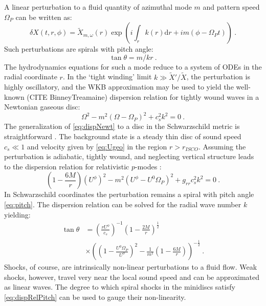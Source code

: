 \documentclass{emulateapj}
\newcommand{\dd}{\mbox{d}}
\begin{document}
A linear perturbation to a fluid quantity of azimuthal mode $m$ and pattern speed $\Omega_P$ can be written as:
\begin{equation}
	\delta X(t, r, \phi) = \tilde{X}_{m,\omega}(r) \exp \left( i \int_r k(r) \dd r  + i m (\phi - \Omega_P t) \right)\ . \label{eq:pert}
\end{equation}
Such perturbations are spirals with pitch angle:
\begin{equation}
	\tan \theta = m / k r \ . \label{eq:pitch}
\end{equation}
The hydrodynamics equations for such a mode reduce to a system of ODEs in the radial coordinate $r$.  In the `tight winding' limit $k \gg \tilde{X}'/\tilde{X}$, the perturbation is highly oscillatory, and the WKB approximation may be used to yield the well-known (CITE BinneyTreamaine) dispersion relation for tightly wound waves in a Newtonian gaseous disc:
\begin{equation}
	\Omega^2 - m^2(\Omega-\Omega_P)^2 + c_s^2 k^2 = 0 \ . \label{eq:dispNewt}
\end{equation}
The generalization of \eqref{eq:dispNewt} to a disc in the Schwarzschild metric is straightforward \citep{Perez97}.  The background state is a steady thin disc of sound speed $c_s \ll 1$ and velocity given by \eqref{eq:Ugeo} in the region $r > r_{ISCO}$.  Assuming the perturbation is adiabatic, tightly wound, and neglecting vertical structure leads to the dispersion relation for relativistic $p$-modes \citep{Abramowicz13}:
\begin{equation}
	\left(1-\frac{6M}{r} \right)\left(U^\phi\right)^2 - m^2(U^\phi-U^0\Omega_P)^2 + g_{rr} c_s^2 k^2 = 0 \ . \label{eq:disprel}
\end{equation}
In Schwarzschild coordinates the perturbation remains a spiral with pitch angle \eqref{eq:pitch}.  The dispersion relation can be solved for the radial wave number $k$ yielding:
\begin{align}
	\tan \theta &= \left( \frac{r U^\phi}{c_s} \right)^{-1} \left(1-\frac{2M}{r}\right)^{\frac{1}{2}} \label{eq:dispRelPitch} \\ \nonumber
		&\times \left(\left(1- \frac{U^0 \Omega_P}{U^\phi}\right)^2 - \frac{1}{m^2}\left(1-\frac{6M}{r}\right)\right)^{-\frac{1}{2}}\ . 
\end{align}
Shocks, of course, are intrinsically non-linear perturbations to a fluid flow.  Weak shocks, however, travel very near the local sound speed and can be approximated as linear waves.  The degree to which spiral shocks in the minidiscs satisfy \eqref{eq:dispRelPitch} can be used to gauge their non-linearity.  
\end{document}
